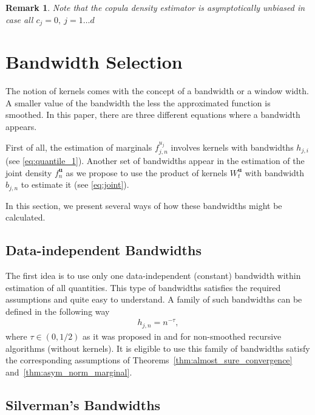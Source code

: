 \documentclass[12pt]{article}
\newtheorem{remark}{Remark}
\begin{document}
	\begin{remark}
		Note that the copula density estimator is asymptotically unbiased in case all $ c_j=0, ~j=1\dots d $
	\end{remark}
	
	\section{Bandwidth Selection}\label{sec:bandwidth_selection}
	
	The notion of kernels comes with the concept of a bandwidth or a window width. A smaller value of the bandwidth the less the approximated function is smoothed. In this paper, there are three different equations where a bandwidth appears.
	
	First of all, the estimation of marginals $ f^{u_j}_{j, n} $ involves kernels with bandwidths $ h_{j, i} $ (see \eqref{eq:quantile_1}). Another set of bandwidths appear in the estimation of the joint density $ f^{\mathbf{u}}_n $ as we propose to use the product of kernels $ W_t^{\mathbf{u}} $ with bandwidth $ b_{j, n} $ to estimate it (see \eqref{eq:joint}). 
	
	In this section, we present several ways of how these bandwidths might be calculated.
	
	\subsection{Data-independent Bandwidths}\label{sec:data_indep}
	
	The first idea is to use only one data-independent (constant) bandwidth within estimation of all quantities. This type of bandwidths satisfies the required assumptions and quite easy to understand. A family of such bandwidths can be defined in the following way 
	\begin{align}
		h_{j, n} = n^{-\tau}, 
	\end{align}
	where $ \tau \in (0, 1/2) $ as it was proposed in \textcite{Robinson1975} and \textcite{Holst1987} for non-smoothed recursive algorithms (without kernels). It is eligible to use this family of bandwidths satisfy the corresponding assumptions of Theorems~\ref{thm:almost_sure_convergence} and~\ref{thm:asym_norm_marginal}.
	
	\subsection{Silverman's Bandwidths}
	
\end{document}
